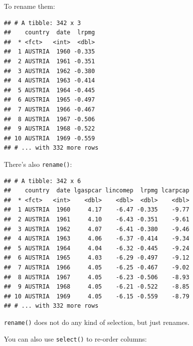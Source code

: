 \documentclass[]{gitbook}
\newenvironment{Shaded}{\begin{snugshade}}{\end{snugshade}}
\newcommand{\DataTypeTok}[1]{\textcolor[rgb]{0.13,0.29,0.53}{#1}}
\newcommand{\KeywordTok}[1]{\textcolor[rgb]{0.13,0.29,0.53}{\textbf{#1}}}
\newcommand{\NormalTok}[1]{#1}
\newcommand{\OperatorTok}[1]{\textcolor[rgb]{0.81,0.36,0.00}{\textbf{#1}}}
\newcommand{\StringTok}[1]{\textcolor[rgb]{0.31,0.60,0.02}{#1}}
\theoremstyle{definition}
\theoremstyle{definition}
\theoremstyle{definition}
\theoremstyle{remark}
\begin{document}
To rename them:

\begin{Shaded}
\end{Shaded}

\begin{verbatim}
## # A tibble: 342 x 3
##    country  date  lrpmg
##  * <fct>   <int>  <dbl>
##  1 AUSTRIA  1960 -0.335
##  2 AUSTRIA  1961 -0.351
##  3 AUSTRIA  1962 -0.380
##  4 AUSTRIA  1963 -0.414
##  5 AUSTRIA  1964 -0.445
##  6 AUSTRIA  1965 -0.497
##  7 AUSTRIA  1966 -0.467
##  8 AUSTRIA  1967 -0.506
##  9 AUSTRIA  1968 -0.522
## 10 AUSTRIA  1969 -0.559
## # ... with 332 more rows
\end{verbatim}

There's also \texttt{rename()}:

\begin{Shaded}
\end{Shaded}

\begin{verbatim}
## # A tibble: 342 x 6
##    country  date lgaspcar lincomep  lrpmg lcarpcap
##  * <fct>   <int>    <dbl>    <dbl>  <dbl>    <dbl>
##  1 AUSTRIA  1960     4.17    -6.47 -0.335    -9.77
##  2 AUSTRIA  1961     4.10    -6.43 -0.351    -9.61
##  3 AUSTRIA  1962     4.07    -6.41 -0.380    -9.46
##  4 AUSTRIA  1963     4.06    -6.37 -0.414    -9.34
##  5 AUSTRIA  1964     4.04    -6.32 -0.445    -9.24
##  6 AUSTRIA  1965     4.03    -6.29 -0.497    -9.12
##  7 AUSTRIA  1966     4.05    -6.25 -0.467    -9.02
##  8 AUSTRIA  1967     4.05    -6.23 -0.506    -8.93
##  9 AUSTRIA  1968     4.05    -6.21 -0.522    -8.85
## 10 AUSTRIA  1969     4.05    -6.15 -0.559    -8.79
## # ... with 332 more rows
\end{verbatim}

\texttt{rename()} does not do any kind of selection, but just renames.

You can also use \texttt{select()} to re-order columns:

\begin{Shaded}
\end{Shaded}
\end{document}
